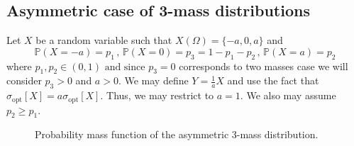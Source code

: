 \documentclass[a4paper, 10pt]{article}
\renewcommand{\P}{\mathbb{P}}
\theoremstyle{definition}
\begin{document}
\subsection{Asymmetric case of 3-mass distributions}\label{subsec;asymmthreepoints}

Let $X$ be a random variable such that $X(\Omega)=\{-a,0,a\}$ and 
\begin{equation}
    \P(X=-a)=p_1\,,\, \P(X=0)=p_3 = 1-p_1-p_2\,,\, \P(X=a)=p_2
\end{equation}
where $p_1, p_2\in \left( 0,1\right) \text{ and since } p_3=0$ corresponds to two masses case  we will consider $p_3 > 0$ and $a>0$. We may define $Y=\frac{1}{a}X$ and use the fact that $\sigma_{\mathrm{opt}}[X]=a \sigma_{\mathrm{opt}}[X]$. Thus, we may restrict to $a=1$. We also may assume $p_2 \geq p_1$.  

\begin{figure}[h!]
    \centering
    \caption{Probability mass function of the asymmetric 3-mass distribution.}
    \label{fig:three_mass_distribution}
\end{figure}
\end{document}
